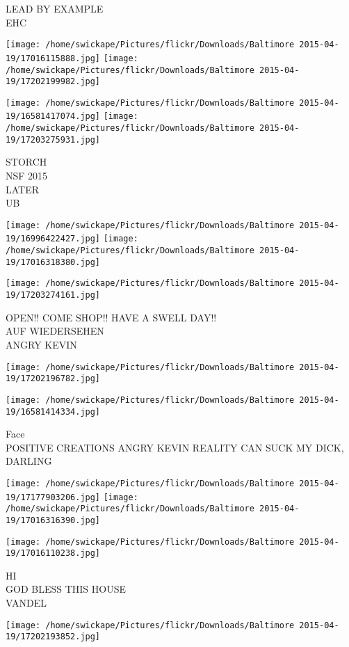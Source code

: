 \documentclass[10pt,letterpaper]{article}
\begin{document}
LEAD BY EXAMPLE\\
EHC
\pagebreak

\texttt{[image: /home/swickape/Pictures/flickr/Downloads/Baltimore 2015-04-19/17016115888.jpg]}
\texttt{[image: /home/swickape/Pictures/flickr/Downloads/Baltimore 2015-04-19/17202199982.jpg]}

\texttt{[image: /home/swickape/Pictures/flickr/Downloads/Baltimore 2015-04-19/16581417074.jpg]}
\texttt{[image: /home/swickape/Pictures/flickr/Downloads/Baltimore 2015-04-19/17203275931.jpg]}

STORCH\\
NSF 2015\\
LATER\\
UB
\pagebreak

\texttt{[image: /home/swickape/Pictures/flickr/Downloads/Baltimore 2015-04-19/16996422427.jpg]}
\texttt{[image: /home/swickape/Pictures/flickr/Downloads/Baltimore 2015-04-19/17016318380.jpg]}

\texttt{[image: /home/swickape/Pictures/flickr/Downloads/Baltimore 2015-04-19/17203274161.jpg]}

OPEN!! COME SHOP!! HAVE A SWELL DAY!!\\
AUF WIEDERSEHEN\\
ANGRY KEVIN
\pagebreak

\texttt{[image: /home/swickape/Pictures/flickr/Downloads/Baltimore 2015-04-19/17202196782.jpg]}

\vspace{0.25in}
\texttt{[image: /home/swickape/Pictures/flickr/Downloads/Baltimore 2015-04-19/16581414334.jpg]}

Face\\
POSITIVE CREATIONS ANGRY KEVIN REALITY CAN SUCK MY DICK, DARLING
\pagebreak

\texttt{[image: /home/swickape/Pictures/flickr/Downloads/Baltimore 2015-04-19/17177903206.jpg]}
\texttt{[image: /home/swickape/Pictures/flickr/Downloads/Baltimore 2015-04-19/17016316390.jpg]}

\texttt{[image: /home/swickape/Pictures/flickr/Downloads/Baltimore 2015-04-19/17016110238.jpg]}

HI\\
GOD BLESS THIS HOUSE\\
VANDEL
\pagebreak

\texttt{[image: /home/swickape/Pictures/flickr/Downloads/Baltimore 2015-04-19/17202193852.jpg]}
\end{document}
